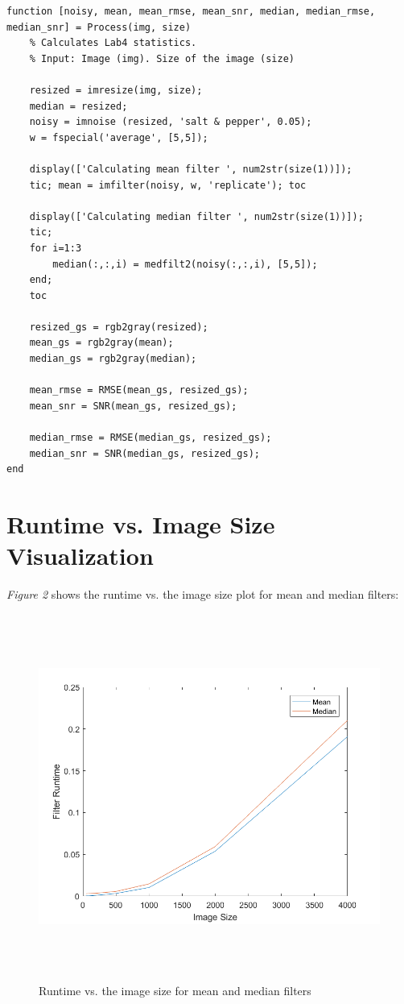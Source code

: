 \documentclass[a4paper,11pt]{article}
\begin{document}
\begin{lstlisting}[caption={Matlab function to resize an image to the specified value, add noise, filter and compute statistics},captionpos=b,style=Matlab-editor]
function [noisy, mean, mean_rmse, mean_snr, median, median_rmse, median_snr] = Process(img, size)
    % Calculates Lab4 statistics.
    % Input: Image (img). Size of the image (size)

    resized = imresize(img, size);
    median = resized;
    noisy = imnoise (resized, 'salt & pepper', 0.05);
    w = fspecial('average', [5,5]);

    display(['Calculating mean filter ', num2str(size(1))]);
    tic; mean = imfilter(noisy, w, 'replicate'); toc

    display(['Calculating median filter ', num2str(size(1))]);
    tic;
    for i=1:3
        median(:,:,i) = medfilt2(noisy(:,:,i), [5,5]);
    end;
    toc

    resized_gs = rgb2gray(resized);
    mean_gs = rgb2gray(mean);
    median_gs = rgb2gray(median);

    mean_rmse = RMSE(mean_gs, resized_gs);
    mean_snr = SNR(mean_gs, resized_gs);

    median_rmse = RMSE(median_gs, resized_gs);
    median_snr = SNR(median_gs, resized_gs);
end
\end{lstlisting}

\newpage
\section*{Runtime vs. Image Size Visualization}
\emph{Figure 2} shows the runtime vs. the image size plot for mean and median filters:

\begin{figure}[!htb]
  \centering
  \includegraphics[width=16cm, height=12cm]{2.png}
  \caption{\small Runtime vs. the image size for mean and median filters}
\end{figure}
\end{document}

